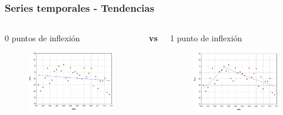 \documentclass{beamer}
\begin{document}
\begin{frame}\frametitle{Series temporales - Tendencias}
	\begin{columns}
		\begin{column}{0.5\textwidth}
			\centering \normalsize 0 puntos de inflexión
			\begin{figure}
				\includegraphics[width=\textwidth]{images/jpo0.png}
			\end{figure}
			
		\end{column}
		\large{\textbf{vs}}
		\begin{column}{0.5\textwidth}
			\centering \normalsize 1 punto de inflexión
			\begin{figure}
				\centering
				\includegraphics[width=\textwidth]{images/jpo1.png}
			\end{figure}
		\end{column}
	\end{columns}


\end{frame}
\end{document}
